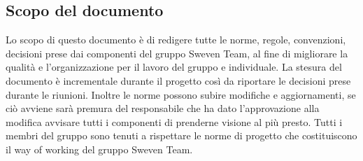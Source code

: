 \subsection{Scopo del documento}
Lo scopo di questo documento è di redigere tutte le norme, regole, convenzioni, decisioni 
prese dai componenti del gruppo Sweven Team, al fine di migliorare la qualità e l'organizzazione
per il lavoro del gruppo e individuale. \newline
La stesura del documento è incrementale durante il progetto così da riportare le decisioni
prese durante le riunioni. Inoltre le norme possono subire modifiche e aggiornamenti,
se ciò avviene sarà premura del responsabile che ha dato l'approvazione alla modifica 
avvisare tutti i componenti di prenderne visione al più presto. \newline 
Tutti i membri del gruppo sono tenuti a rispettare le norme di progetto che costituiscono
il way of working del gruppo Sweven Team.
